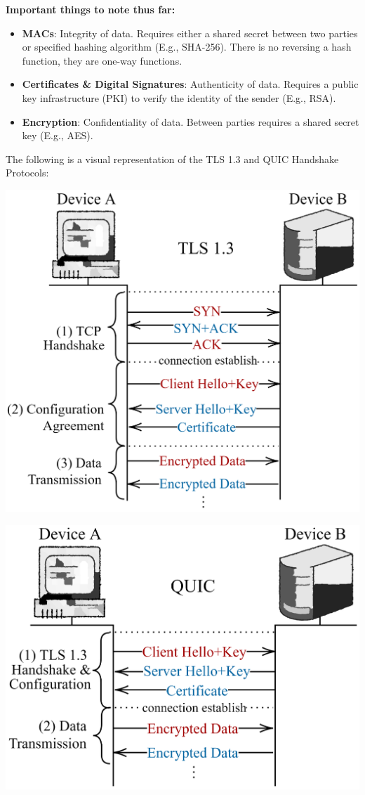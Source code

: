 \vspace{2em}
\textbf{Important things to note thus far:}
\begin{itemize}
    \item \textbf{MACs}: Integrity of data. Requires either a shared secret between two parties or specified hashing algorithm (E.g., SHA-256).
    There is no reversing a hash function, they are one-way functions.
    \item \textbf{Certificates \& Digital Signatures}: Authenticity of data. Requires a public key infrastructure (PKI) to verify the identity of the sender (E.g., RSA).
    \item \textbf{Encryption}: Confidentiality of data. Between parties requires a shared secret key (E.g., AES).
\end{itemize}

    \newpage 

\noindent
The following is a visual representation of the TLS 1.3 and QUIC Handshake Protocols:\\

\vspace{1em}

\includegraphics[width=.74\textwidth]{Sections/sec/enc/rsa/tls/tls13.png}

\vspace{1em}
\hspace{1.5em}
\includegraphics[width=.68\textwidth]{Sections/sec/enc/rsa/tls/quic.png}
    


